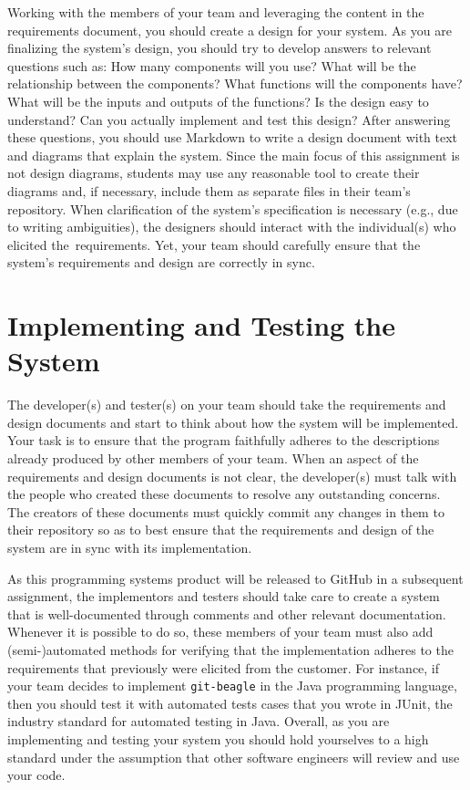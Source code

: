 Working with the members of your team and leveraging the content in the requirements document, you should create a
design for your system.  As you are finalizing the system's design, you should try to develop answers to relevant
questions such as: How many components will you use? What will be the relationship between the components? What
functions will the components have? What will be the inputs and outputs of the functions?  Is the design easy to
understand?  Can you actually implement and test this design? After answering these questions, you should use Markdown
to write a design document with text and diagrams that explain the system. Since the main focus of this assignment is
not design diagrams, students may use any reasonable tool to create their diagrams and, if necessary, include them as
separate files in their team's repository. When clarification of the system's specification is necessary (e.g., due to
writing ambiguities), the designers should interact with the individual(s) who elicited \mbox{the requirements}. Yet,
your team should carefully ensure that the system's requirements and design are correctly in sync.

\section*{Implementing and Testing the System}

The developer(s) and tester(s) on your team should take the requirements and design documents and start to think about
how the system will be implemented. Your task is to ensure that the program faithfully adheres to the descriptions
already produced by other members of your team. When an aspect of the requirements and design documents is not clear,
the developer(s) must talk with the people who created these documents to resolve any outstanding concerns. The creators
of these documents must quickly commit any changes in them to their repository so as to best ensure that the
requirements and design of the system are in sync with its implementation.

As this programming systems product will be released to GitHub in a subsequent assignment, the implementors and testers
should take care to create a system that is well-documented through comments and other relevant documentation. Whenever
it is possible to do so, these members of your team must also add (semi-)automated methods for verifying that the
implementation adheres to the requirements that previously were elicited from the customer. For instance, if your team
decides to implement {\tt git-beagle} in the Java programming language, then you should test it with automated tests
cases that you wrote in JUnit, the industry standard for automated testing in Java. Overall, as you are implementing and
testing your system you should hold yourselves to a high standard under the assumption that other software engineers
will review and use your code.

